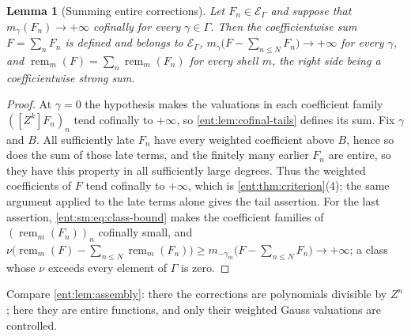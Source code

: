 \documentclass[11pt]{article}
\theoremstyle{plain}
\newtheorem{lemma}[lemma]{Lemma}
\theoremstyle{plain}
\theoremstyle{plain}
\theoremstyle{definition}
\theoremstyle{definition}
\theoremstyle{definition}
\theoremstyle{definition}
\theoremstyle{remark}
\newcommand{\E}{\mathcal E_\Gamma}
\DeclareMathOperator{\remp}{rem}\DeclareMathOperator{\Res}{Res}
\begin{document}
\begin{lemma}[Summing entire corrections]\label{ent:sm:lem:entire-sum}
Let $F_n\in\E$ and suppose that $m_\gamma(F_n)\to+\infty$ cofinally for every
$\gamma\in\Gamma$. Then the coefficientwise sum $F=\sum_nF_n$ is defined and
belongs to $\E$, $m_\gamma\bigl(F-\sum_{n\le N}F_n\bigr)\to+\infty$ for every
$\gamma$, and $\remp_m(F)=\sum_n\remp_m(F_n)$ for every shell $m$, the right
side being a coefficientwise strong sum.
\end{lemma}
\begin{proof}
At $\gamma=0$ the hypothesis makes the valuations in each coefficient family
$([Z^k]F_n)_n$ tend cofinally to $+\infty$, so \cref{ent:lem:cofinal-tails}
defines its sum. Fix $\gamma$ and $B$. All sufficiently late $F_n$ have every
weighted coefficient above $B$, hence so does the sum of those late terms,
and the finitely many earlier $F_n$ are entire, so they have this property in
all sufficiently large degrees. Thus the weighted coefficients of $F$ tend
cofinally to $+\infty$, which is \cref{ent:thm:criterion}(4); the same
argument applied to the late terms alone gives the tail assertion. For the
last assertion, \eqref{ent:sm:eq:class-bound} makes the coefficient families
of $(\remp_m(F_n))_n$ cofinally small, and
$\nu\bigl(\remp_m(F)-\sum_{n\le N}\remp_m(F_n)\bigr)\ge
m_{-\gamma_m}\bigl(F-\sum_{n\le N}F_n\bigr)\to+\infty$; a class whose $\nu$
exceeds every element of $\Gamma$ is zero.
\end{proof}

Compare \cref{ent:lem:assembly}: there the corrections are polynomials
divisible by $Z^n$; here they are entire functions, and only their weighted
Gauss valuations are controlled.
\end{document}
